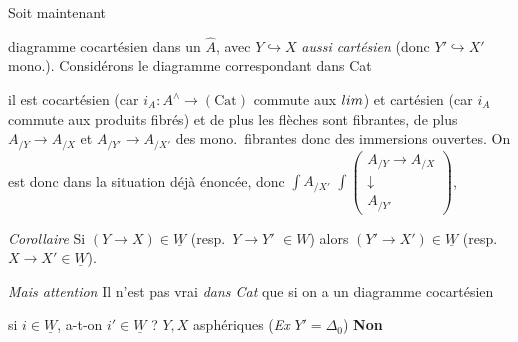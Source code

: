 \documentclass[11pt,a4paper]{article}
\begin{document}

Soit maintenant


diagramme cocartésien dans un $\widehat{A}$, avec $Y \hookrightarrow X$
\emph{ aussi cartésien} (donc $Y' \hookrightarrow X'$ mono.). Considérons le diagramme
 correspondant dans Cat


il est cocartésien (car $i_A : A^{\wedge} \to (\mathrm{Cat})$ commute aux
$\varinjlim$) et cartésien (car $i_A$ commute aux produits fibrés) et de
plus les flèches \ill{} sont fibrantes, de plus $A_{/Y} \to A_{/X}$ et
$A_{/Y'} \to A_{/X'}$  \ill{} des mono.\ fibrantes donc des
immersions ouvertes. On est donc dans la situation déjà énoncée, donc
$\int A_{/X'}$ 
$\int \begin{pmatrix} A_{/Y} \to A_{/X} \\ \downarrow \\ A_{/Y'} \end{pmatrix}$,

\emph{Corollaire} Si $(Y \to X) \in \underline{W}$ (resp.\ $Y \to Y'$
\struck{\ill{}} $\in W$) alors $(Y' \to X') \in \underline{W}$ (resp.\ $X \to X'
\in \underline{W}$).


\emph{Mais attention} Il n'est pas vrai \emph{dans Cat} que si on a un
diagramme cocartésien


si $i \in \underline{W}$, a-t-on $i' \in \underline{W}$ ? \ill{} $Y, X$
asphériques (\emph{Ex} $Y' = \Delta_0$) \textbf{Non}
\end{document}
